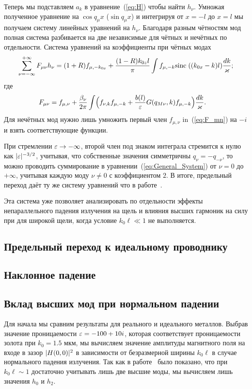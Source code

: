 Теперь мы подставляем $a_k$ в уравнение~(\ref{eq:H}) чтобы найти $h_\nu$. Умножая полученное уравнение на  $\cos{q_\mu x}$ ($\sin{q_\mu x}$) 
и интегрируя от $x = -l$ до $x = l$ мы получаем систему линейных уравнений на $h_\nu$. Благодаря разным чётностям мод полная система
разбивается на две независимые для чётных и нечётных по отдельности. Система уравнений на коэффициенты при чётных модах 
\begin{align}
	\sum_{\nu=-\infty}^{+\infty} F_{\mu \nu} h_\nu = (1+R)f_{\mu,-k_{0x}} + \frac{(1-R)k_{0z} l}{\pi}\int f_{\mu,-k}\mathrm{sinc}\;((k_{0x}-k)l) \frac{dk}{\varkappa}; \label{eq:General_System}
\end{align}
где 
\begin{align}
F_{\mu \nu} &= f_{\mu,\nu} + \frac{\beta_\nu}{2\pi}\int
\Bigl(f_{\nu,k}f_{\mu,-k}  + \frac{b(l)}{\varepsilon} G(q_{M\nu},k)f_{\mu,-k} \Bigr)\frac{dk}{\varkappa}.
\label{eq:F_mn}
\end{align}
Для нечётных мод нужно лишь умножить первый член $f_{\mu,\nu}$ in~(\ref{eq:F_mn}) на $-i$ и взять соответствующие функции. 

При стремлении $\varepsilon \to -\infty$, второй член под знаком интеграла стремится к нулю как $\lvert\varepsilon\rvert^{-3/2}$, 
учитывая, что собственные значения симметричны $q_{\nu} = -q_{-\nu}$, то можно проводить суммирование в уравнении~(\ref{eq:General_System}) 
от $\nu = 0$ до $+\infty$, учитывая каждую моду $\nu \neq 0$ с коэффициентом $2$. В итоге, предельный переход даёт ту же систему
уравнений что в работе~\cite{Shapiro16}.

Эта система уже позволяет анализировать по отдельности эффекты непараллельного падения излучения на щель и влияния высших гармоник на силу
при для широкой щели, когда условие $k_0 \ell \ll 1$ не выполняется.

\subsection{Предельный переход к идеальному проводнику}

\subsection{Наклонное падение}

\subsection{Вклад высших мод при нормальном падении}
Для начала мы сравним результаты для реального и идеального металлов. Выбрав значение проницаемости $\varepsilon = -100 + 10i$, которая соответствует 
проницаемости золота при $k_0 = 1.5$ мкм, мы вычисляем значение амплитуды магнитного поля на входе в зазор $\lvert H(0,0)\rvert^2$ в зависимости от 
безразмерной ширины $k_0 \ell$ в случае нормального падения излучения. Так как в работе~\cite{Shapiro16} было показано, что при 
$k_0 \ell \sim 1$ достаточно учитывать лишь две высшие моды, мы вычисляем лишь значения $h_0$ и $h_2$.

